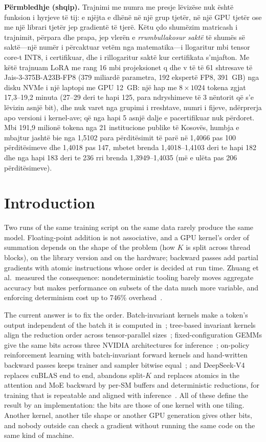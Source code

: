 \documentclass[11pt]{article}
\begin{document}
\noindent\textbf{Përmbledhje (shqip).} Trajnimi me numra me presje lëvizëse nuk është funksion i hyrjeve të tij: e njëjta
e dhënë në një grup tjetër, në një GPU tjetër ose me një librari tjetër jep gradientë të tjerë. Këtu çdo shumëzim matricash i
trajnimit, përpara dhe prapa, jep vlerën e \emph{rrumbullakosur saktë} të shumës së saktë---një numër i përcaktuar vetëm nga
matematika---i llogaritur mbi tensor core-t INT8, i certifikuar, dhe i rillogaritur saktë kur certifikata s'mjafton. Me këtë
trajnuam LoRA me rang 16 mbi projeksionet q dhe v të të 61 shtresave të Jais-3-375B-A23B-FP8 (379 miliardë parametra, 192
ekspertë FP8, 391~GB) nga disku NVMe i një laptopi me GPU 12~GB: një hap me $8\times1024$ tokena zgjat 17,3--19,2 minuta
(27--29 deri te hapi 125, para ndryshimeve të 3 nëntorit që s'e lëvizin asnjë bit), dhe nuk varet nga grupimi i rreshtave, numri i fijeve, ndërprerja apo versioni i kernel-ave; që nga hapi 5 asnjë dalje e
pacertifikuar nuk përdoret. Mbi 191,9 milionë tokena nga 21 institucione publike të Kosovës, humbja e mbajtur jashtë bie nga
1,5102 para përditësimit të parë në 1,4066 pas 100 përditësimeve dhe 1,4018 pas 147, mbetet brenda
1,4018--1,4103 deri te hapi 182 dhe nga hapi 183 deri te 236 rri brenda 1,3949--1,4035 (më e ulëta pas 206 përditësimeve).

\section{Introduction}

Two runs of the same training script on the same data rarely produce the same model. Floating-point addition is not
associative, and a GPU kernel's order of summation depends on the shape of the problem (how $K$ is split across thread
blocks), on the library version and on the hardware; backward passes add partial gradients with atomic instructions whose
order is decided at run time. Zhuang et al.\ measured the consequence: nondeterministic tooling barely moves aggregate accuracy
but makes performance on subsets of the data much more variable, and enforcing determinism cost up to 746\%
overhead~\cite{zhuang21}.

The current answer is to fix the order. Batch-invariant kernels make a token's output independent of the batch it is computed
in~\cite{he25}; tree-based invariant kernels align the reduction order across tensor-parallel sizes~\cite{tbik};
fixed-configuration GEMMs give the same bits across three NVIDIA architectures for inference~\cite{reprofuse}; on-policy
reinforcement learning with batch-invariant forward kernels and hand-written backward passes keeps trainer and sampler bitwise
equal~\cite{vllm25}; and DeepSeek-V4 replaces cuBLAS end to end, abandons split-$K$ and replaces atomics in the attention and
MoE backward by per-SM buffers and deterministic reductions, for training that is repeatable and aligned with
inference~\cite{dsv4}. All of these define the result by an implementation: the bits are those of one kernel with one tiling.
Another kernel, another tile shape or another GPU generation gives other bits, and nobody outside can check a gradient without
running the same code on the same kind of machine.
\end{document}
